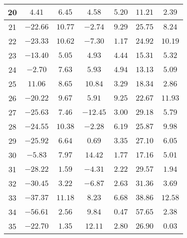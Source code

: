 \begin{table}[H]
\begin{tabular}{|c|c|c|c|c|c|c|}
                        20   &  $4.41$    &  $6.45$   &   $4.58$    &   $5.20$  &  $11.21$  & $2.39$   \\ \hline
                        21   &  $-22.66$  &  $10.77$  &   $-2.74$   &   $9.29$  &  $25.75$  & $8.24$   \\ \hline
                        22   &  $-23.33$  &  $10.62$  &   $-7.30$   &   $1.17$  &  $24.92$  & $10.19$  \\ \hline
                        23   &  $-13.40$  &  $5.05$   &   $4.93$    &   $4.44$  &  $15.31$  & $5.32$   \\ \hline
                        24   &  $-2.70$   &  $7.63$   &   $5.93$    &   $4.94$  &  $13.13$  & $5.09$   \\ \hline
                        25   &  $11.06$   &  $8.65$   &   $10.84$   &   $3.29$  &  $18.34$  & $2.86$   \\ \hline
                        26   &  $-20.22$  &  $9.67$   &   $5.91$    &   $9.25$  &  $22.67$  & $11.93$  \\ \hline
                        27   &  $-25.63$  &  $7.46$   &   $-12.45$  &   $3.00$  &  $29.18$  & $5.79$   \\ \hline
                        28   &  $-24.55$  &  $10.38$  &   $-2.28$   &   $6.19$  &  $25.87$  & $9.98$   \\ \hline
                        29   &  $-25.92$  &  $6.64$   &   $0.69$    &   $3.35$  &  $27.10$  & $6.05$   \\ \hline
                        30   &  $-5.83$   &  $7.97$   &   $14.42$   &   $1.77$  &  $17.16$  & $5.01$   \\ \hline
                        31   &  $-28.22$  &  $1.59$   &   $-4.31$   &   $2.22$  &  $29.57$  & $1.94$   \\ \hline
                        32   &  $-30.45$  &  $3.22$   &   $-6.87$   &   $2.63$  &  $31.36$  & $3.69$   \\ \hline
                        33   &  $-37.37$  &  $11.18$  &   $8.23$    &   $6.68$  &  $38.86$  & $12.58$  \\ \hline
                        34   &  $-56.61$  &  $2.56$   &   $9.84$    &   $0.47$  &  $57.65$  & $2.38$   \\ \hline
                        35   &  $-22.70$  &  $1.35$   &   $12.11$   &   $2.80$  &  $26.90$  & $0.03$   \\ \hline
        \end{tabular}
    \label{tab:media_lab_4_total}
\end{table}

